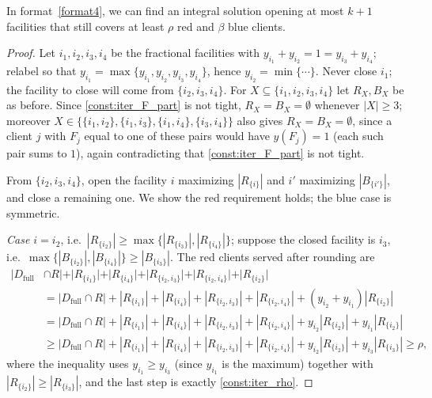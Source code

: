 \documentclass[a4paper,11pt]{article}
\begin{document}
\begin{lemma}
\label{lem:format4}
In format~\ref{format4}, we can find an integral solution opening at
most $k+1$ facilities that still covers at least $\rho$ red and $\beta$
blue clients.
\end{lemma}
\begin{proof}
Let $i_1,i_2,i_3,i_4$ be the fractional facilities with $y_{i_1}+y_{i_2}
=1=y_{i_3}+y_{i_4}$; relabel so that $y_{i_1}=\max\{y_{i_1},y_{i_2},
y_{i_3},y_{i_4}\}$, hence $y_{i_2}=\min\{\cdots\}$. Never close $i_1$; the
facility to close will come from $\{i_2,i_3,i_4\}$. For $X\subseteq
\{i_1,i_2,i_3,i_4\}$ let $R_X,B_X$ be as before. Since
\eqref{const:iter_F_part} is not tight, $R_X=B_X=\emptyset$ whenever
$|X|\ge3$; moreover $X\in\{\{i_1,i_2\},\{i_1,i_3\},\{i_1,i_4\},
\{i_3,i_4\}\}$ also gives $R_X=B_X=\emptyset$, since a client $j$ with
$F_j$ equal to one of these pairs would have $y(F_j)=1$ (each such pair
sums to $1$), again contradicting that \eqref{const:iter_F_part} is not
tight.

From $\{i_2,i_3,i_4\}$, open the facility $i$ maximizing $|R_{\{i\}}|$
and $i'$ maximizing $|B_{\{i'\}}|$, and close a remaining one. We show
the red requirement holds; the blue case is symmetric.

\emph{Case $i=i_2$}, i.e.\ $|R_{\{i_2\}}|\ge\max\{|R_{\{i_3\}}|,
|R_{\{i_4\}}|\}$; suppose the closed facility is $i_3$, i.e.\
$\max\{|B_{\{i_2\}}|,|B_{\{i_4\}}|\}\ge|B_{\{i_3\}}|$. The red clients
served after rounding are
\begin{align*}
|D_\text{full} & \cap R| + |R_{\{i_1\}}| + |R_{\{i_4\}}| + |R_{\{i_2,i_3\}}| + |R_{\{i_2,i_4\}}| + |R_{\{i_2\}}| \\
&=|D_\text{full} \cap R| + |R_{\{i_1\}}| + |R_{\{i_4\}}| + |R_{\{i_2,i_3\}}| + |R_{\{i_2,i_4\}}| + (y_{i_2} + y_{i_1}) |R_{\{i_2\}}| \\
&=|D_\text{full} \cap R| + |R_{\{i_1\}}| + |R_{\{i_4\}}| + |R_{\{i_2,i_3\}}| + |R_{\{i_2,i_4\}}| + y_{i_2}|R_{\{i_2\}}| + y_{i_1} |R_{\{i_2\}}|\\
&\geq|D_\text{full} \cap R| + |R_{\{i_1\}}| + |R_{\{i_4\}}| + |R_{\{i_2,i_3\}}| + |R_{\{i_2,i_4\}}| + y_{i_2}|R_{\{i_2\}}| + y_{i_3} |R_{\{i_3\}}| \geq \rho,
\end{align*}
where the inequality uses $y_{i_1}\ge y_{i_3}$ (since $y_{i_1}$ is the
maximum) together with $|R_{\{i_2\}}|\ge|R_{\{i_3\}}|$, and the last step
is exactly \eqref{const:iter_rho}.


\end{proof}
\end{document}
